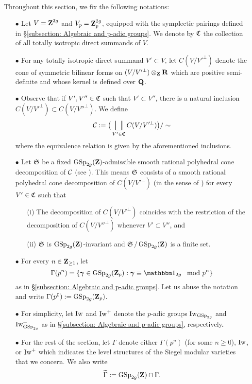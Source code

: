 Throughout this section, we fix the following notations: \begin{enumerate}
    \item[$\bullet$] Let $V=\operatorname{\mathbf{Z}}^{2g}$ and $V_p=\operatorname{\mathbf{Z}}_p^{2g}$, equipped with the symplectic pairings defined in \S \ref{subsection: Algebraic and p-adic groups}. We denote by $\operatorname{\mathfrak{C}}$ the collection of all totally isotropic direct summands of $V$.
    \item[$\bullet$] For any totally isotropic direct summand $V'\subset V$, let $C(V/V'^{\perp})$ denote the cone of symmetric bilinear forms on $(V/V'^{\perp})\otimes_{\operatorname{\mathbf{Z}}}\operatorname{\mathbf{R}}$ which are positive semi-definite and whose kernel is defined over $\operatorname{\mathbf{Q}}$.
    \item[$\bullet$] Observe that if $V', V''\in \operatorname{\mathfrak{C}}$ such that $V'\subset V''$, there is a natural inclusion $C(V/V'^{\perp})\subset C(V/V''^{\perp})$. We define $$\operatorname{\mathcal{C}}:=\big(\bigsqcup_{V'\in \operatorname{\mathfrak{C}}}C(V/V'^{\perp})\big)/\sim$$ where the equivalence relation is given by the aforementioned inclusions.
    \item[$\bullet$] Let $\operatorname{\mathfrak{S}}$ be a fixed $\operatorname{GSp}_{2g}(\operatorname{\mathbf{Z}})$-admissible smooth rational polyhedral cone decomposition of $\operatorname{\mathcal{C}}$ (see \cite[Definition 3.2.3.1]{Stroh-TorComp}). This means $\operatorname{\mathfrak{S}}$ consists of a smooth rational polyhedral cone decomposition of $C(V/V'^{\perp})$ (in the sense of \cite[Chapter IV, \S 2]{Faltings-Chai}) for every $V'\in \operatorname{\mathfrak{C}}$ such that 
    \begin{enumerate}
    \item[(i)] The decomposition of $C(V/V'^{\perp})$ coincides with the restriction of the decomposition of $C(V/V''^{\perp})$ whenever $V'\subset V''$, and
    \item[(ii)] $\operatorname{\mathfrak{S}}$ is $\operatorname{GSp}_{2g}(\operatorname{\mathbf{Z}})$-invariant and $\operatorname{\mathfrak{S}}/\operatorname{GSp}_{2g}(\operatorname{\mathbf{Z}})$ is a finite set.
    \end{enumerate}
    \item[$\bullet$] For every $n\in \operatorname{\mathbf{Z}}_{\geq 1}$, let 
    $$\Gamma(p^n)=\{\bfgamma\in \GSp_{2g}(\Z_p): \bfgamma\equiv \one_{2g}\mod p^n\}$$
    as in \S \ref{subsection: Algebraic and p-adic groups}. Let us abuse the notation and write $\Gamma(p^0):=\operatorname{GSp}_{2g}(\operatorname{\mathbf{Z}}_p)$. 
    \item[$\bullet$] For simplicity, let $\operatorname{Iw}$ and $\operatorname{Iw}^+$ denote the $p$-adic groups $\operatorname{Iw}_{\operatorname{GSp}_{2g}}$ and $\operatorname{Iw}^+_{\operatorname{GSp}_{2g}}$ as in \S \ref{subsection: Algebraic and p-adic groups}, respectively.
    \item[$\bullet$] For the rest of the section, let $\Gamma$ denote either $\Gamma(p^n)$ (for some $n\geq 0$), $\operatorname{Iw}$, or $\operatorname{Iw}^+$ which indicates the level structures of the Siegel modular varieties that we concern. We also write $$\widetilde{\Gamma}:=\operatorname{GSp}_{2g}(\operatorname{\mathbf{Z}})\cap\Gamma.$$ 
    \end{enumerate}


